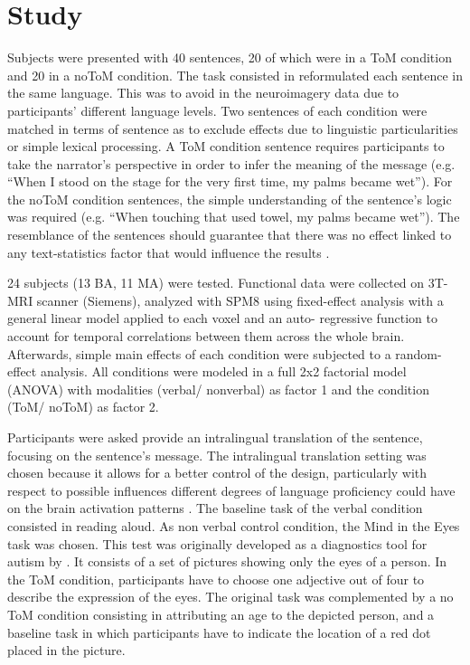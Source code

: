 \documentclass[output=paper]{LSP/langsci}
\begin{document}
\section{Study}

Subjects were presented with 40  sentences, 20 of which were in a ToM condition and 20 in a noToM condition. The task consisted in reformulated each sentence in the same language. This was to avoid  in the neuroimagery data due to participants' different language levels. Two sentences of each condition were matched in terms of sentence  as to exclude effects due to linguistic particularities or simple lexical processing. A ToM condition sentence requires participants to take the narrator's perspective in order to infer the meaning of the message (e.g. ``When I stood on the stage for the very first time, my palms became wet''). For the noToM condition sentences, the simple understanding of the sentence's logic was required (e.g. ``When touching that used towel, my palms became wet''). The resemblance of the sentences should guarantee that there was no effect linked to any text-statistics factor that would influence the results \citep{DodellFeder2011}.

24 subjects (13 BA, 11 MA) were tested. Functional data were collected on 3T-MRI scanner (Siemens), analyzed with SPM8 using fixed-effect analysis with a general linear model applied to each voxel and an auto- regressive function to account for temporal correlations between them across the whole brain. Afterwards, simple main effects of each condition were subjected to a random-effect analysis. All conditions were modeled in a full 2x2 factorial model (ANOVA) with modalities (verbal/ nonverbal) as factor 1 and the condition (ToM/ noToM) as factor 2.

Participants were asked provide an intralingual translation of the sentence, focusing on the sentence's message. The intralingual translation setting was chosen because it allows for a better control of the design, particularly with respect to possible influences different degrees of language proficiency could have on the brain activation patterns \citep{Kim1997, Korning2009}. The baseline task of the verbal condition consisted in reading aloud. As non verbal control condition, the Mind in the Eyes task was chosen. This test was originally developed as a diagnostics tool for autism by \citet{BaronCohen1997}. It consists of a set of pictures showing only the eyes of a person. In the ToM condition, participants have to choose one adjective out of four to describe the expression of the eyes. The original task was complemented by a no ToM condition consisting in attributing an age to the depicted person, and a baseline task in which participants have to indicate the location of a red dot placed in the picture.
\end{document}
